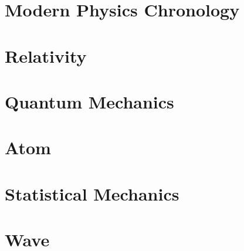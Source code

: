 \documentclass[10pt]{report}
\begin{document}
\pagestyle{empty}


\clearpage

\section{Modern Physics Chronology}

\clearpage 

\section{Relativity}

\clearpage

\clearpage

\section{Quantum Mechanics}

\clearpage

\section{Atom}

\clearpage

\clearpage

\section{Statistical Mechanics}

\clearpage

\section{Wave}

\clearpage
\end{document}
